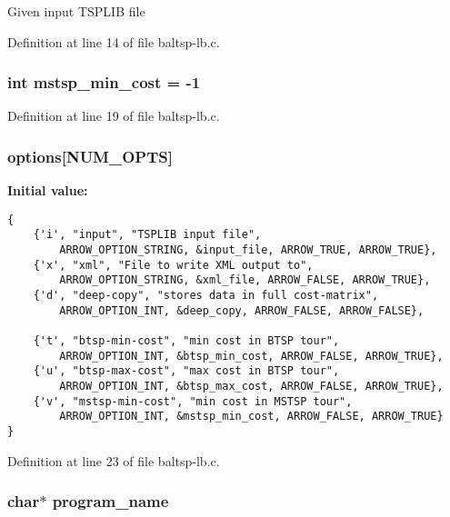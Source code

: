 Given input TSPLIB file 

Definition at line 14 of file baltsp-lb.c.\hypertarget{bin_2baltsp-lb_8c_79e1b33b7d744b8baacfe9c0b2e73013}{
\subsubsection[{mstsp\_\-min\_\-cost}]{\setlength{\rightskip}{0pt plus 5cm}int {\bf mstsp\_\-min\_\-cost} = -1}}
\label{bin_2baltsp-lb_8c_79e1b33b7d744b8baacfe9c0b2e73013}




Definition at line 19 of file baltsp-lb.c.\hypertarget{bin_2baltsp-lb_8c_cea6a9709d519c143f30db401a0d0c72}{
\subsubsection[{options}]{ {\bf options}\mbox{[}NUM\_\-OPTS\mbox{]}}}
\label{bin_2baltsp-lb_8c_cea6a9709d519c143f30db401a0d0c72}


\textbf{Initial value:}

\begin{Code}\begin{verbatim} 
{
    {'i', "input", "TSPLIB input file", 
        ARROW_OPTION_STRING, &input_file, ARROW_TRUE, ARROW_TRUE},
    {'x', "xml", "File to write XML output to",
        ARROW_OPTION_STRING, &xml_file, ARROW_FALSE, ARROW_TRUE},
    {'d', "deep-copy", "stores data in full cost-matrix",
        ARROW_OPTION_INT, &deep_copy, ARROW_FALSE, ARROW_FALSE},
        
    {'t', "btsp-min-cost", "min cost in BTSP tour",
        ARROW_OPTION_INT, &btsp_min_cost, ARROW_FALSE, ARROW_TRUE},
    {'u', "btsp-max-cost", "max cost in BTSP tour",
        ARROW_OPTION_INT, &btsp_max_cost, ARROW_FALSE, ARROW_TRUE},
    {'v', "mstsp-min-cost", "min cost in MSTSP tour",
        ARROW_OPTION_INT, &mstsp_min_cost, ARROW_FALSE, ARROW_TRUE}
}
\end{verbatim}
\end{Code}


Definition at line 23 of file baltsp-lb.c.\hypertarget{bin_2baltsp-lb_8c_289c5900d90626d909f0a85d5a0ed61d}{
\subsubsection[{program\_\-name}]{\setlength{\rightskip}{0pt plus 5cm}char$\ast$ {\bf program\_\-name}}}
\label{bin_2baltsp-lb_8c_289c5900d90626d909f0a85d5a0ed61d}


